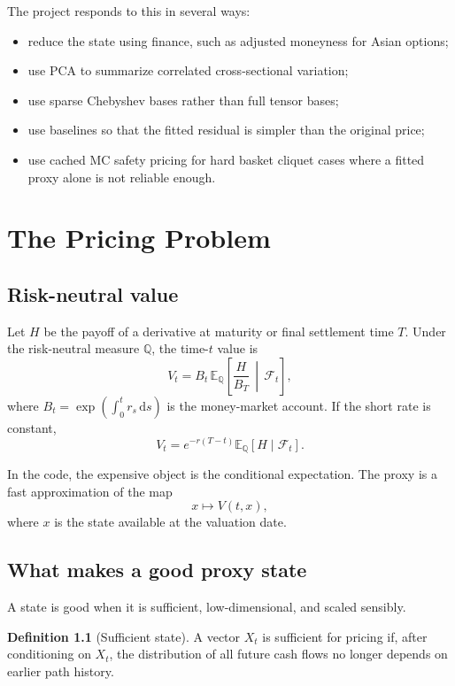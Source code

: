 \documentclass[11pt,oneside]{book}
\theoremstyle{definition}
\newtheorem{definition}{Definition}[chapter]
\newcommand{\E}{\mathbb{E}}
\newcommand{\Q}{\mathbb{Q}}
\newcommand{\dd}{\,\mathrm{d}}
\begin{document}
The project responds to this in several ways:
\begin{itemize}
  \item reduce the state using finance, such as adjusted moneyness for Asian options;
  \item use PCA to summarize correlated cross-sectional variation;
  \item use sparse Chebyshev bases rather than full tensor bases;
  \item use baselines so that the fitted residual is simpler than the original price;
  \item use cached MC safety pricing for hard basket cliquet cases where a fitted proxy alone is not reliable enough.
\end{itemize}

\chapter{The Pricing Problem}

\section{Risk-neutral value}
Let \(H\) be the payoff of a derivative at maturity or final settlement time \(T\). Under the risk-neutral measure \(\Q\), the time-\(t\) value is
\[
  V_t = B_t\,\E_\Q\!\left[\frac{H}{B_T}\,\middle|\,\mathcal F_t\right],
\]
where \(B_t=\exp(\int_0^t r_s\dd s)\) is the money-market account. If the short rate is constant,
\[
  V_t = e^{-r(T-t)}\E_\Q[H\mid\mathcal F_t].
\]

In the code, the expensive object is the conditional expectation. The proxy is a fast approximation of the map
\[
  x \longmapsto V(t,x),
\]
where \(x\) is the state available at the valuation date.

\section{What makes a good proxy state}
A state is good when it is sufficient, low-dimensional, and scaled sensibly.

\begin{definition}[Sufficient state]
A vector \(X_t\) is sufficient for pricing if, after conditioning on \(X_t\), the distribution of all future cash flows no longer depends on earlier path history.
\end{definition}
\end{document}
